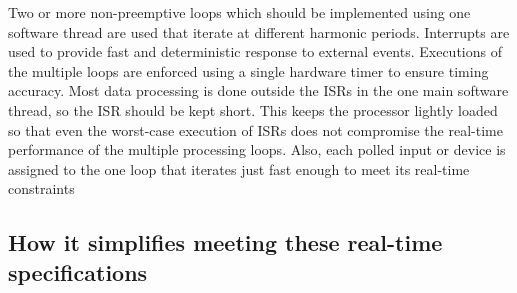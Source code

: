 \begin{enumerate}
   Two or more non-preemptive loops which should be implemented using one
   software thread are used that iterate at different harmonic periods.
   Interrupts are used to provide fast and deterministic response to external
   events.  Executions of the multiple loops are enforced using a single
   hardware timer to ensure timing accuracy.  Most data processing is done
   outside the ISRs in the one main software thread, so the ISR should be kept
   short.  This keeps the processor lightly loaded so that even the worst-case
   execution of ISRs does not compromise the real-time performance of the
   multiple processing loops.  Also, each polled input or device is assigned to
   the one loop that iterates just fast enough to meet its real-time constraints
  \end{enumerate}

  \subsection{How it simplifies meeting these real-time specifications}
